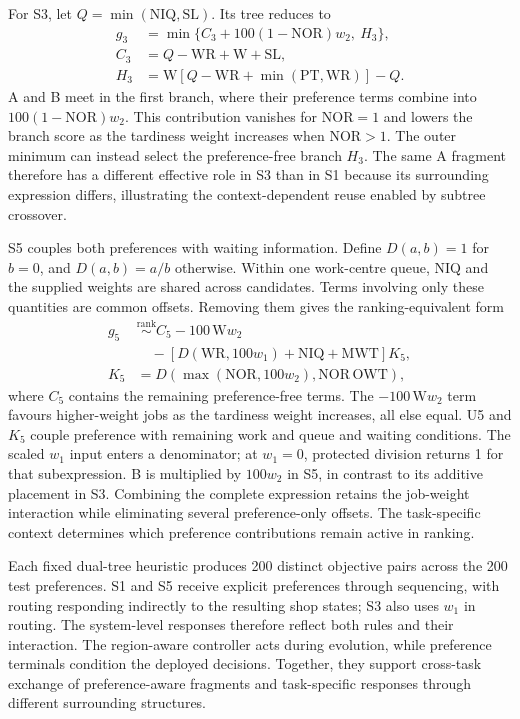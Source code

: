 For S3, let $Q=\min(\mathrm{NIQ},\mathrm{SL})$. Its tree reduces to
\begin{equation}
\begin{aligned}
g_3&=\min\{C_3+100(1-\mathrm{NOR})w_2,\ H_3\},\\
C_3&=Q-\mathrm{WR}+\mathrm{W}+\mathrm{SL},\\
H_3&=\mathrm{W}[Q-\mathrm{WR}+\min(\mathrm{PT},\mathrm{WR})]-Q.
\end{aligned}
\label{eq:case-tree-s3}
\end{equation}
A and B meet in the first branch, where their preference terms combine into $100(1-\mathrm{NOR})w_2$. This contribution vanishes for $\mathrm{NOR}=1$ and lowers the branch score as the tardiness weight increases when $\mathrm{NOR}>1$. The outer minimum can instead select the preference-free branch $H_3$. The same A fragment therefore has a different effective role in S3 than in S1 because its surrounding expression differs, illustrating the context-dependent reuse enabled by subtree crossover.

S5 couples both preferences with waiting information. Define $D(a,b)=1$ for $b=0$, and $D(a,b)=a/b$ otherwise. Within one work-centre queue, NIQ and the supplied weights are shared across candidates. Terms involving only these quantities are common offsets. Removing them gives the ranking-equivalent form
\begin{equation}
\begin{aligned}
g_5&\overset{\mathrm{rank}}{\sim}
C_5-100\,\mathrm{W}w_2\\
&\quad-[D(\mathrm{WR},100w_1)+\mathrm{NIQ}+\mathrm{MWT}]K_5,\\
K_5&=D\!\left(\max(\mathrm{NOR},100w_2),\mathrm{NOR}\,\mathrm{OWT}\right),
\end{aligned}
\label{eq:case-tree-s5}
\end{equation}
where $C_5$ contains the remaining preference-free terms. The $-100\,\mathrm{W}w_2$ term favours higher-weight jobs as the tardiness weight increases, all else equal. U5 and $K_5$ couple preference with remaining work and queue and waiting conditions. The scaled $w_1$ input enters a denominator; at $w_1=0$, protected division returns 1 for that subexpression. B is multiplied by $100w_2$ in S5, in contrast to its additive placement in S3. Combining the complete expression retains the job-weight interaction while eliminating several preference-only offsets. The task-specific context determines which preference contributions remain active in ranking.

Each fixed dual-tree heuristic produces 200 distinct objective pairs across the 200 test preferences. S1 and S5 receive explicit preferences through sequencing, with routing responding indirectly to the resulting shop states; S3 also uses $w_1$ in routing. The system-level responses therefore reflect both rules and their interaction. The region-aware controller acts during evolution, while preference terminals condition the deployed decisions. Together, they support cross-task exchange of preference-aware fragments and task-specific responses through different surrounding structures.
